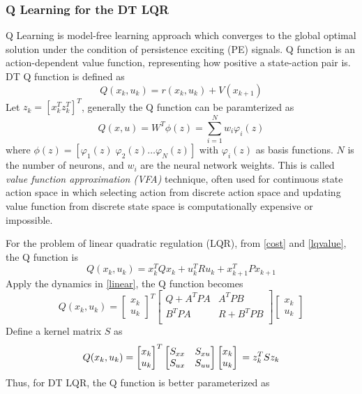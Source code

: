 \documentclass[conference]{IEEEtran}
\begin{document}
\subsubsection{Q Learning for the DT LQR} \label{qlearing}
Q Learning is model-free learning approach which converges to the global optimal solution under the condition of persistence exciting (PE) signals. Q function is an action-dependent value function, representing how positive a state-action pair is. DT Q function is defined as 
	\[Q(x_k, u_k) = r(x_k, u_k) + V(x_{k+1})\]
Let \(z_k = [x^T_k z^T_k]^T\), generally the Q function can be paramterized as
	\[Q(x, u) = W^T\phi(z) = \sum_{i=1}^{N}w_i\varphi_i(z)\]
where \(\phi(z) = [\varphi_1(z) \; \varphi_2(z) \dots \varphi_N(z)]\) with \(\varphi_i(z)\) as basis functions. \(N\) is the number of neurons, and \(w_i\) are the neural network weights. This is called \textit{value function approximation (VFA)} technique, often used for continuous state action space in which selecting action from discrete action space and updating value function from discrete state space is computationally expensive or impossible.
\par For the problem of linear quadratic regulation (LQR), from \eqref{cost} and \eqref{lqvalue}, the Q function is 
	\[Q(x_k, u_k) = x^T_kQx_k + u^T_kRu_k + x^T_{k+1}Px_{k+1}\]
Apply the dynamics in \eqref{linear}, the Q function becomes
\[Q(x_k, u_k) = \begin{bmatrix}
x_k\\
u_k
\end{bmatrix}^T
\begin{bmatrix}
	Q+A^TPA & A^TPB\\
	B^TPA & R+B^TPB\\
\end{bmatrix}
\begin{bmatrix}
	x_k\\
	u_k
\end{bmatrix}\]
Define a kernel matrix \(S\) as
\[Q(x_k, u_k) = \begin{bmatrix}
x_k\\
u_k
\end{bmatrix}^T
\begin{bmatrix}
S_{xx} & S_{xu}\\
S_{ux} & S_{uu}\\
\end{bmatrix}
\begin{bmatrix}
x_k\\
u_k
\end{bmatrix} \\
= z^T_kSz_k\]
Thus, for DT LQR, the Q function is better parameterized as
\end{document}
